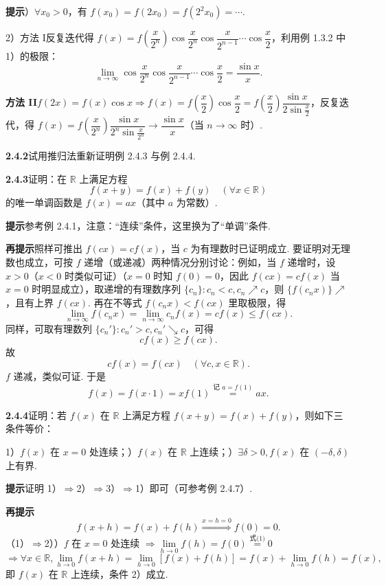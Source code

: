 \documentclass[UTF8,12pt,a4paper,fontset=fandol]{ctexart}
\begin{document}
\noindent\textbf{提示}）$\forall x_0>0$，有 $f(x_0)=f(2x_0)=f(2^2x_0)=\cdots$.

2）方法 I\quad 反复迭代得 $f(x)=f\left(\dfrac{x}{2^n}\right)\cos\dfrac{x}{2^n}\cos\dfrac{x}{2^{n-1}}\cdots\cos\dfrac x2$，利用例 1.3.2 中 1）的极限：
\[
  \lim_{n\to\infty}\cos\frac{x}{2^n}\cos\frac{x}{2^{n-1}}\cdots\cos\frac x2=\frac{\sin x}{x}.
\]

\noindent\textbf{方法 II}\quad $f(2x)=f(x)\cos x\Rightarrow f(x)=f\left(\dfrac x2\right)\cos\dfrac x2=f\left(\dfrac x2\right)\dfrac{\sin x}{2\sin\frac x2}$，反复迭代，得 $f(x)=f\left(\dfrac{x}{2^n}\right)\dfrac{\sin x}{2^n\sin\frac{x}{2^n}}\to\dfrac{\sin x}{x}$（当 $n\to\infty$ 时）.

\noindent\textbf{2.4.2}\quad 试用推归法重新证明例 2.4.3 与例 2.4.4.

\noindent\textbf{2.4.3}\quad 证明：在 $\mathbb{R}$ 上满足方程
\[
  f(x+y)=f(x)+f(y)\quad(\forall x\in\mathbb{R})
\]
的唯一单调函数是 $f(x)=ax$（其中 $a$ 为常数）.

\noindent\textbf{提示}\quad 参考例 2.4.1，注意：“连续”条件，这里换为了“单调”条件.

\noindent\textbf{再提示}\quad 照样可推出 $f(cx)=cf(x)$，当 $c$ 为有理数时已证明成立. 要证明对无理数也成立，可按 $f$ 递增（或递减）两种情况分别讨论：例如，当 $f$ 递增时，设 $x>0$（$x<0$ 时类似可证）（$x=0$ 时知 $f(0)=0$，因此 $f(cx)=cf(x)$ 当 $x=0$ 时明显成立），取递增的有理数序列 $\{c_n\}:c_n<c,c_n\nearrow c$，则 $\{f(c_nx)\}\nearrow$，且有上界 $f(cx)$. 再在不等式 $f(c_nx)<f(cx)$ 里取极限，得
\[
  \lim_{n\to\infty}f(c_nx)=\lim_{n\to\infty}c_nf(x)=cf(x)\le f(cx). \tag{1}
\]
同样，可取有理数列 $\{c_n'\}:c_n'>c,c_n'\searrow c$，可得
\[
  cf(x)\ge f(cx). \tag{2}
\]
故
\[
  cf(x)=f(cx)\quad(\forall c,x\in\mathbb{R}).
\]
$f$ 递减，类似可证. 于是
\[
  f(x)=f(x\cdot1)=xf(1)\overset{\text{记 }a=f(1)}{=}ax.
\]

\noindent\textbf{2.4.4}\quad 证明：若 $f(x)$ 在 $\mathbb{R}$ 上满足方程 $f(x+y)=f(x)+f(y)$，则如下三条件等价：

1）$f(x)$ 在 $x=0$ 处连续；）$f(x)$ 在 $\mathbb{R}$ 上连续；）$\exists\delta>0,f(x)$ 在 $(-\delta,\delta)$ 上有界.

\noindent\textbf{提示}\quad 证明 1）$\Rightarrow$2）$\Rightarrow$3）$\Rightarrow$1）即可（可参考例 2.4.7）.

\noindent\textbf{再提示}\quad
\[
  f(x+h)=f(x)+f(h)\overset{x=h=0}{\Longrightarrow}f(0)=0. \tag{1}
\]
（1）$\Rightarrow$2））$f$ 在 $x=0$ 处连续 $\Rightarrow\lim\limits_{h\to0}f(h)=f(0)\overset{\text{式(1)}}{=}0$
\[
\Rightarrow \forall x\in\mathbb{R},\lim_{h\to0}f(x+h)=\lim_{h\to0}[f(x)+f(h)]=f(x)+\lim_{h\to0}f(h)=f(x),
\]
即 $f(x)$ 在 $\mathbb{R}$ 上连续，条件 2）成立.
\end{document}
